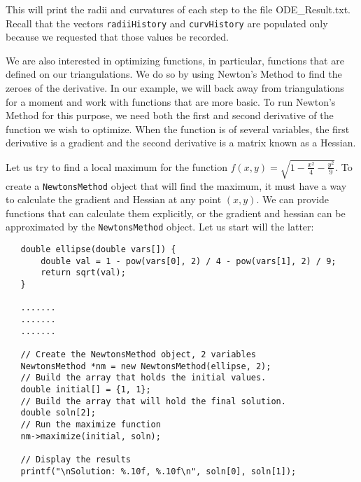 \documentclass{amsart}
\theoremstyle{plain}
\numberwithin{equation}{section}
\begin{document}
\bigskip

This will print the radii and curvatures of each step to the file ODE\_Result.txt. Recall that the vectors \verb|radiiHistory| and \verb|curvHistory| are populated only because we requested that those values be recorded. \newline

We are also interested in optimizing functions, in particular, functions that are defined on our triangulations. We do so by using Newton's Method to find the zeroes of the derivative. In our example, we will back away from triangulations for a moment and work with functions that are more basic. To run Newton's Method for this purpose, we need both the first and second derivative of the function we wish to optimize. When the function is of several variables, the first derivative is a gradient and the second derivative is a matrix known as a Hessian. \newline

Let us try to find a local maximum for the function $f(x,y) = \sqrt{1-\frac{x^2}{4} - \frac{y^2}{9}}$. To create a \verb|NewtonsMethod| object that will find the maximum, it must have a way to calculate the gradient and Hessian at any point $(x,y)$. We can provide functions that can calculate them explicitly, or the gradient and hessian can be approximated by the \verb|NewtonsMethod| object. Let us start will the latter:\newline

\begin{verbatim}
   double ellipse(double vars[]) {
       double val = 1 - pow(vars[0], 2) / 4 - pow(vars[1], 2) / 9;
       return sqrt(val);
   }

   .......
   .......
   .......
	 
   // Create the NewtonsMethod object, 2 variables
   NewtonsMethod *nm = new NewtonsMethod(ellipse, 2);
   // Build the array that holds the initial values.
   double initial[] = {1, 1};
   // Build the array that will hold the final solution.
   double soln[2];
   // Run the maximize function
   nm->maximize(initial, soln);

   // Display the results
   printf("\nSolution: %.10f, %.10f\n", soln[0], soln[1]);
\end{verbatim}

\bigskip
\end{document}
